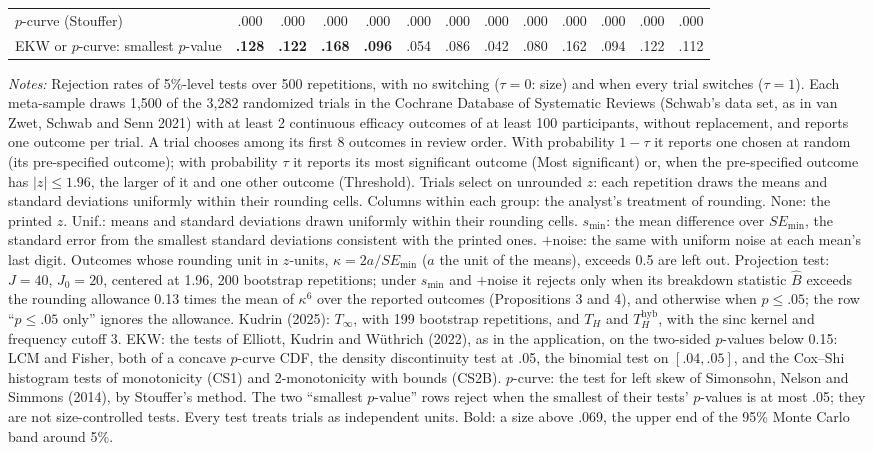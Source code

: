 \begin{table}[htbp]
{\begin{tabular}{lcccccccccccc}
\addlinespace
$p$-curve (Stouffer) & .000 & .000 & .000 & .000 & .000 & .000 & .000 & .000 & .000 & .000 & .000 & .000 \\
EKW or $p$-curve: smallest $p$-value & \textbf{.128} & \textbf{.122} & \textbf{.168} & \textbf{.096} & .054 & .086 & .042 & .080 & .162 & .094 & .122 & .112 \\
\bottomrule
\end{tabular}}
\par\smallskip
\begin{minipage}{\linewidth}\footnotesize\textit{Notes:} Rejection rates of 5\%-level tests over 500 repetitions, with no switching ($\tau = 0$: size) and when every trial switches ($\tau = 1$). Each meta-sample draws 1,500 of the 3,282 randomized trials in the Cochrane Database of Systematic Reviews (Schwab's data set, as in van Zwet, Schwab and Senn 2021) with at least 2 continuous efficacy outcomes of at least 100 participants, without replacement, and reports one outcome per trial. A trial chooses among its first 8 outcomes in review order. With probability $1 - \tau$ it reports one chosen at random (its pre-specified outcome); with probability $\tau$ it reports its most significant outcome (Most significant) or, when the pre-specified outcome has $|z| \le 1.96$, the larger of it and one other outcome (Threshold). Trials select on unrounded $z$: each repetition draws the means and standard deviations uniformly within their rounding cells. Columns within each group: the analyst's treatment of rounding. None: the printed $z$. Unif.: means and standard deviations drawn uniformly within their rounding cells. $s_{\min}$: the mean difference over $SE_{\min}$, the standard error from the smallest standard deviations consistent with the printed ones. $+$noise: the same with uniform noise at each mean's last digit. Outcomes whose rounding unit in $z$-units, $\kappa = 2a/SE_{\min}$ ($a$ the unit of the means), exceeds 0.5 are left out. Projection test: $J = 40$, $J_0 = 20$, centered at 1.96, 200 bootstrap repetitions; under $s_{\min}$ and $+$noise it rejects only when its breakdown statistic $\hat B$ exceeds the rounding allowance 0.13 times the mean of $\kappa^6$ over the reported outcomes (Propositions 3 and 4), and otherwise when $p \le .05$; the row ``$p \le .05$ only'' ignores the allowance. Kudrin (2025): $T_\infty$, with 199 bootstrap repetitions, and $T_H$ and $T_H^{\mathrm{hyb}}$, with the sinc kernel and frequency cutoff 3. EKW: the tests of Elliott, Kudrin and W\"uthrich (2022), as in the application, on the two-sided $p$-values below 0.15: LCM and Fisher, both of a concave $p$-curve CDF, the density discontinuity test at .05, the binomial test on $[.04,.05]$, and the Cox--Shi histogram tests of monotonicity (CS1) and 2-monotonicity with bounds (CS2B). $p$-curve: the test for left skew of Simonsohn, Nelson and Simmons (2014), by Stouffer's method. The two ``smallest $p$-value'' rows reject when the smallest of their tests' $p$-values is at most .05; they are not size-controlled tests. Every test treats trials as independent units. Bold: a size above .069, the upper end of the 95\% Monte Carlo band around 5\%.\end{minipage}
\end{table}
